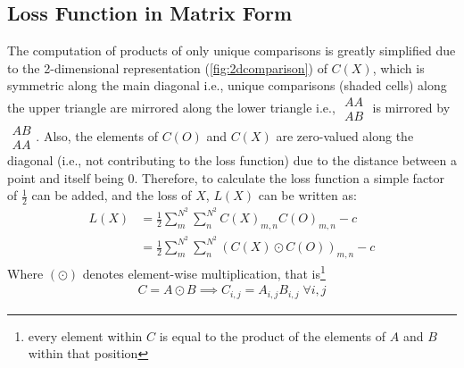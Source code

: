 \subsection{Loss Function in Matrix Form}%
\label{sub:loss_function_as_matrix_multiplications}
The computation of products of only unique comparisons is greatly simplified due to the 2-dimensional representation (\autoref{fig:2dcomparison}) of $C(X)$, which is symmetric along the main diagonal i.e., unique comparisons (shaded cells) along the upper triangle are mirrored along the lower triangle i.e., %
$\begin{smallmatrix}
    AA\\ AB
\end{smallmatrix}
$ is mirrored by
$
\begin{smallmatrix}
    AB\\ AA
\end{smallmatrix}
$. Also, the elements of $C(O)$ and $C(X)$ are zero-valued along the diagonal (i.e., not contributing to the loss function) due to the distance between a point and itself being $0$. Therefore, to calculate the loss function a simple factor of $\frac{1}{2}$ can be added, and the loss of $X$, $L(X)$ can be written as:
\begin{align}
    L(X)&=\frac{1}{2}\sum_m^{N^2}\sum_n^{N^2}C(X)_{m,n}C(O)_{m,n}-c\nonumber\\
        &=\frac{1}{2}\sum_m^{N^2}\sum_n^{N^2}(C(X)\odot C(O))_{m,n}-c
\end{align}
Where $(\odot)$ denotes element-wise multiplication, that is\footnote{every element within $C$ is equal to the product of the elements of $A$ and $B$ within that position}
\begin{align}
    C=A\odot B \implies C_{i,j}=A_{i,j}B_{i,j}\;\forall i,j
\end{align}

